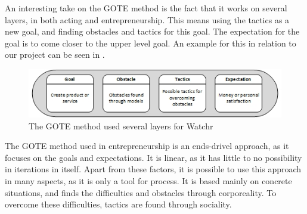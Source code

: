 An interesting take on the GOTE method is the fact that it works on several layers, in both acting and entrepreneurship. This means using the tactics as a new goal, and finding obstacles and tactics for this goal. The expectation for the goal is to come closer to the upper level goal. An example for this in relation to our project can be seen in .


\begin{figure}
\begin{center}
\includegraphics[scale=0.7]{./pics/gote}
\caption{The GOTE method used several layers for Watchr}
\label{fig:gote_watchr}
\end{center}
\end{figure}

The GOTE method used in entrepreneurship is an ends-drivel approach, as it focuses on the goals and expectations. It is linear, as it has little to no possibility in iterations in itself. Apart from these factors, it is possible to use this approach in many aspects, as it is only a tool for process. It is based mainly on concrete situations, and finds the difficulties and obstacles through corporeality. To overcome these difficulties, tactics are found through sociality.